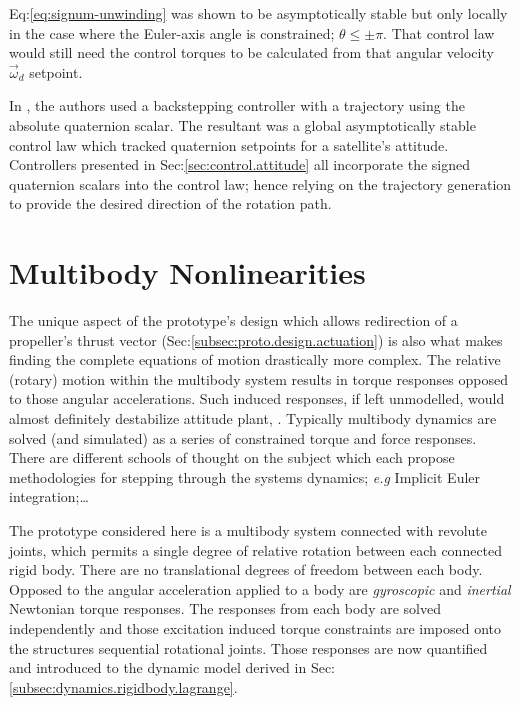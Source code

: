 Eq:\ref{eq:signum-unwinding} was shown to be asymptotically stable but only locally in the case where the Euler-axis angle is constrained; $\theta\leq \pm\pi$. That control law  would still need the control torques to be calculated from that angular velocity $\vec{\omega}_d$ setpoint.
\par
In \cite{intelligentbackstep}, the authors used a backstepping controller with a trajectory using the absolute quaternion scalar. The resultant was a global asymptotically stable control law which tracked quaternion setpoints for a satellite's attitude. Controllers presented in Sec:\ref{sec:control.attitude} all incorporate the signed quaternion scalars into the control law;  hence relying on the trajectory generation to provide the desired direction of the rotation path.
\section{Multibody Nonlinearities}
\label{sec:dynamics.nonlinearities}
The unique aspect of the prototype's design which allows redirection of a propeller's thrust vector (Sec:\ref{subsec:proto.design.actuation}) is also what makes finding the complete equations of motion drastically more complex. The relative (rotary) motion within the multibody system results in torque responses opposed to those angular accelerations. Such induced responses, if left unmodelled, would almost definitely destabilize attitude plant, \cite{inertiaspin}. Typically multibody dynamics are solved (and simulated) as a series of constrained torque and force responses. There are different schools of thought on the subject which each propose methodologies for stepping through the systems dynamics; \emph{e.g} Implicit Euler integration;\cite{physicallybased,multibodydynamics}\ldots
\par
The prototype considered here is a multibody system connected with revolute joints, which permits a single degree of relative rotation between each connected rigid body. There are no translational degrees of freedom between each body. Opposed to the angular acceleration applied to a body are \emph{gyroscopic} and \emph{inertial} Newtonian torque responses. The responses from each body are solved independently and those excitation induced torque constraints are imposed onto the structures sequential rotational joints. Those responses are now quantified and introduced to the dynamic model derived in Sec:\ref{subsec:dynamics.rigidbody.lagrange}. 
